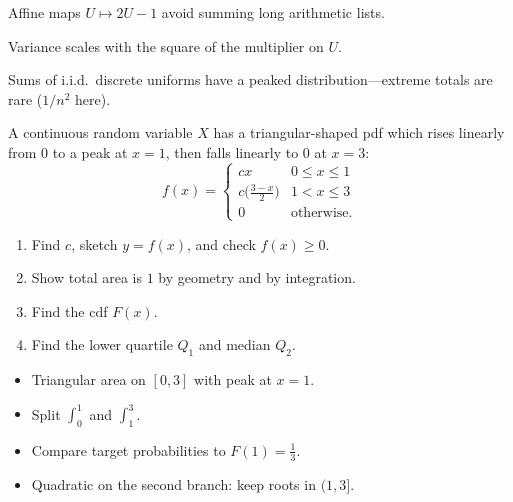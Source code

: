 \begin{takeaways}
\item Affine maps $U\mapsto 2U-1$ avoid summing long arithmetic lists.
\item Variance scales with the square of the multiplier on $U$.
\item Sums of i.i.d.\ discrete uniforms have a peaked distribution---extreme totals are rare ($1/n^{2}$ here).
\end{takeaways}

\begin{problem}
A continuous random variable $X$ has a triangular-shaped pdf which rises linearly from $0$ to a peak at $x=1$, then falls linearly to $0$ at $x=3$:
\[
f(x)=\begin{cases}
cx & 0\le x\le 1\\
c\bigl(\frac{3-x}{2}\bigr) & 1< x\le 3\\
0 & \text{otherwise.}
\end{cases}
\]
\begin{enumerate}[label=\textbf{(\roman*)}]
  \item Find $c$, sketch $y=f(x)$, and check $f(x)\ge 0$.
  \item Show total area is $1$ by geometry and by integration.
  \item Find the cdf $F(x)$.
  \item Find the lower quartile $Q_{1}$ and median $Q_{2}$.
\end{enumerate}


\end{problem}

\begin{hint}
\begin{itemize}[leftmargin=*]
  \item Triangular area on $[0,3]$ with peak at $x=1$.
  \item Split $\int_{0}^{1}$ and $\int_{1}^{3}$.
  \item Compare target probabilities to $F(1)=\frac{1}{3}$.
  \item Quadratic on the second branch: keep roots in $(1,3]$.
\end{itemize}
\end{hint}

